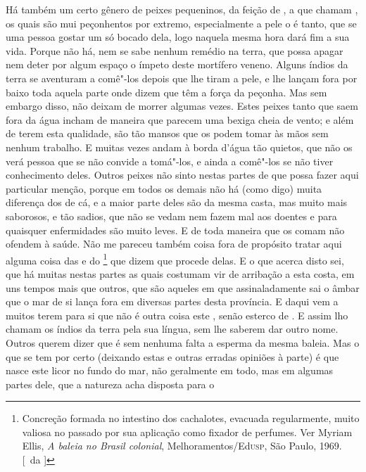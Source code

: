 Há também um certo gênero de peixes pequeninos, da feição de
, a que chamam , os quais são 
mui peçonhentos por extremo, especialmente a pele		%
o é tanto, que se uma pessoa gostar um só bocado dela, logo naquela
mesma hora dará fim a sua vida. Porque não há, nem se sabe nenhum
remédio na terra, que possa apagar nem deter por algum espaço o ímpeto
deste mortífero veneno. Alguns índios da terra se aventuram a comê"-los			%
depois que lhe tiram a pele, e lhe lançam fora por baixo toda aquela
parte onde dizem que têm a força da peçonha. Mas sem embargo disso, não
deixam de morrer algumas vezes. Estes peixes tanto que saem fora da água			%
incham de maneira que parecem uma bexiga cheia de vento; e além de terem
esta qualidade, são tão mansos que os podem tomar às mãos sem nenhum
trabalho. E muitas vezes andam à borda d'água tão
quietos, que não os verá pessoa que se não convide a tomá"-los, e ainda
a comê"-los se não tiver conhecimento deles. Outros peixes não sinto
nestas partes de que possa fazer aqui particular menção, porque em
todos os demais não há (como digo) muita diferença dos de cá, e a
maior parte deles são da mesma casta, mas muito mais saborosos, e tão sadios,
que não se vedam nem fazem mal aos doentes e para quaisquer
enfermidades são muito leves. E de toda maneira que os comam não			%
ofendem à saúde. Não me pareceu também coisa fora de propósito tratar
aqui alguma coisa das  e do \footnote{ Concreção formada no intestino
dos cachalotes, evacuada regularmente, muito valiosa no passado por sua aplicação como fixador
de perfumes. Ver Myriam Ellis, \textit{A baleia no Brasil colonial}, 
Melhoramentos/Ed\textsc{usp}, São Paulo, 1969. [~da ]} que dizem que procede delas. E o
que acerca disto sei, que há muitas nestas partes as quais costumam vir
de arribação a esta costa, em uns tempos mais que outros, que são aqueles
em que assinaladamente sai o âmbar que o mar de si lança fora em
diversas partes desta província. E daqui vem a muitos terem para si que
não é outra coisa este , senão esterco de . E assim lho
chamam os índios da terra pela sua língua, sem lhe saberem dar outro			%
nome. Outros querem dizer que é sem nenhuma falta a esperma da mesma 
baleia. Mas o que se tem por certo (deixando estas e outras erradas
opiniões à parte) é que nasce este licor no fundo do mar, não geralmente
em todo, mas em algumas partes dele, que a natureza acha disposta para o

